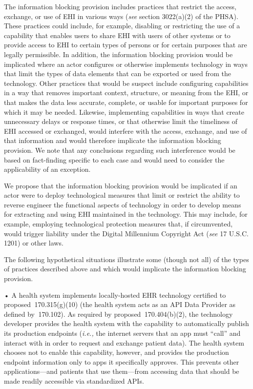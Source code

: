 \documentclass[twoside,11pt]{article}
\begin{document}
          The information blocking provision includes practices that restrict the access, exchange, or use of EHI in various ways (\emph{see} section 3022(a)(2) of the PHSA). These practices could include, for example, disabling or restricting the use of a capability that enables users to share EHI with users of other systems or to provide access to EHI to certain types of persons or for certain purposes that are legally permissible. In addition, the information blocking provision would be implicated where an actor configures or otherwise implements technology in ways that limit the types of data elements that can be exported or used from the technology. Other practices that would be suspect include configuring capabilities in a way that removes important context, structure, or meaning from the EHI, or that makes the data less accurate, complete, or usable for important purposes for which it may be needed. Likewise, implementing capabilities in ways that create unnecessary delays or response times, or that otherwise limit the timeliness of EHI accessed or exchanged, would interfere with the access, exchange, and use of that information and would therefore implicate the information blocking provision. We note that any conclusions regarding such interference would be based on fact-finding specific to each case and would need to consider the applicability of an exception.



          We propose that the information blocking provision would be implicated if an actor were to deploy technological measures that limit or restrict the ability to reverse engineer the functional aspects of technology in order to develop means for extracting and using EHI maintained in the technology. This may include, for example, employing technological protection measures that, if circumvented, would trigger liability under the Digital Millennium Copyright Act (\emph{see} 17 U.S.C. 1201) or other laws.


          The following hypothetical situations illustrate some (though not all) of the types of practices described above and which would implicate the information blocking provision.



          • A health system implements locally-hosted EHR technology certified to proposed \textsection{} 170.315(g)(10) (the health system acts as an API Data Provider as defined by \textsection{} 170.102). As required by proposed \textsection{} 170.404(b)(2), the technology developer provides the health system with the capability to automatically publish its production endpoints (\emph{i.e.,} the internet servers that an app must “call” and interact with in order to request and exchange patient data). The health system chooses not to enable this capability, however, and provides the production endpoint information only to apps it specifically approves. This prevents other applications—and patients that use them—from accessing data that should be made readily accessible via standardized APIs.
\end{document}
